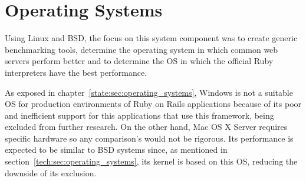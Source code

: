 \section{Operating Systems} %
\label{solution:sec:operating_systems}

Using Linux and BSD, the focus on this system component was to create generic benchmarking tools, determine the operating system in which common web servers perform better and to determine the OS in which the official Ruby interpreters have the best performance.

As exposed in chapter~\ref{state:sec:operating_systems}, Windows is not a suitable OS for production environments of Ruby on Rails applications because of its poor and inefficient support for this applications that use this framework, being excluded from further research. On the other hand, Mac OS X Server requires specific hardware so any comparison's would not be rigorous. Its performance is expected to be similar to BSD systems since, as mentioned in section~\ref{tech:sec:operating_systems}, its kernel is based on this OS, reducing the downside of its exclusion.

\begin{comment}
Create generic and specific tools of OS performance measurement

Find the best OS for Rails by benchmarking the most likely candidates (same hardware)

Tweak OSes configurations

OSes are already highly optimized, OS development doesn't make much sense
\end{comment}


